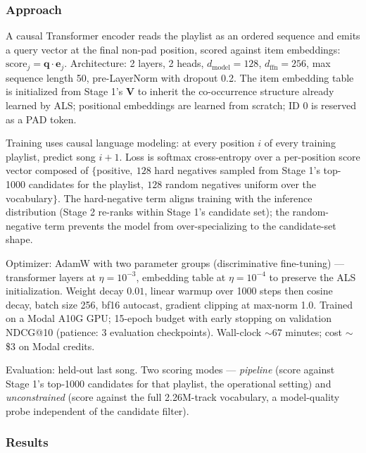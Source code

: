\documentclass[11pt,a4paper]{article}
\begin{document}
\subsubsection{Approach}

A causal Transformer encoder reads the playlist as an ordered sequence and emits a query vector at the final non-pad position, scored against item embeddings: $\text{score}_j = \mathbf{q} \cdot \mathbf{e}_j$. Architecture: 2 layers, 2 heads, $d_{\text{model}}=128$, $d_{\text{ffn}}=256$, max sequence length 50, pre-LayerNorm with dropout 0.2. The item embedding table is initialized from Stage 1's $\mathbf{V}$ to inherit the co-occurrence structure already learned by ALS; positional embeddings are learned from scratch; ID 0 is reserved as a PAD token.

Training uses causal language modeling: at every position $i$ of every training playlist, predict song $i+1$. Loss is softmax cross-entropy over a per-position score vector composed of $\{$positive$,\ 128$ hard negatives sampled from Stage 1's top-1000 candidates for the playlist$,\ 128$ random negatives uniform over the vocabulary$\}$. The hard-negative term aligns training with the inference distribution (Stage 2 re-ranks within Stage 1's candidate set); the random-negative term prevents the model from over-specializing to the candidate-set shape.

Optimizer: AdamW with two parameter groups (discriminative fine-tuning) — transformer layers at $\eta=10^{-3}$, embedding table at $\eta=10^{-4}$ to preserve the ALS initialization. Weight decay $0.01$, linear warmup over 1000 steps then cosine decay, batch size 256, bf16 autocast, gradient clipping at max-norm 1.0. Trained on a Modal A10G GPU; 15-epoch budget with early stopping on validation NDCG@10 (patience: 3 evaluation checkpoints). Wall-clock $\sim$67 minutes; cost $\sim$\$3 on Modal credits.

Evaluation: held-out last song. Two scoring modes --- \emph{pipeline} (score against Stage 1's top-1000 candidates for that playlist, the operational setting) and \emph{unconstrained} (score against the full 2.26M-track vocabulary, a model-quality probe independent of the candidate filter).

\subsubsection{Results}
\end{document}

